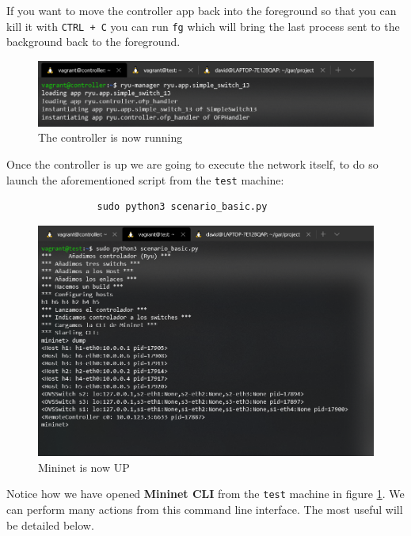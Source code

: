 \documentclass[12pt]{report}
\begin{document}
			If you want to move the controller app back into the foreground so that you can kill it with \texttt{CTRL + C} you can run \texttt{fg} which will bring the last process sent to the background back to the foreground.

			\begin{figure}
				\centering
				\includegraphics[scale = 1]{controller_ex.png}
				\caption{The controller is now running}
			\end{figure}

			Once the controller is up we are going to execute the network itself, to do so launch the aforementioned script from the \texttt{test} machine:

			\begin{verbatim}
				sudo python3 scenario_basic.py
			\end{verbatim}

			\begin{figure}
				\centering
				\includegraphics[scale = 1]{mininet_up.png}
				\caption{Mininet is now UP}
				\label{f:mininet_up}
			\end{figure}

			Notice how we have opened \textbf{Mininet CLI} from the \texttt{test} machine in figure \ref{f:mininet_up}. We can perform many actions from this command line interface. The most useful will be detailed below.
\end{document}

